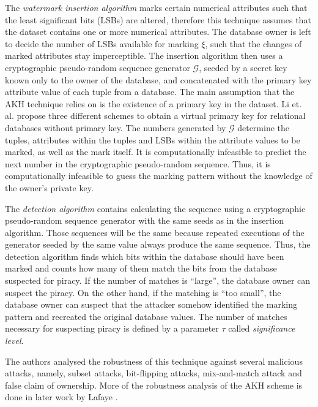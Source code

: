 \begin{enumerate}[leftmargin=*]
The \textit{watermark insertion algorithm} marks certain numerical attributes such that the least significant bits (LSBs) are altered, therefore this technique assumes that the dataset contains one or more numerical attributes.
The database owner is left to decide the number of LSBs available for marking $\xi$, such that the changes of marked attributes stay imperceptible. 
The insertion algorithm then uses a cryptographic pseudo-random sequence generator $\mathcal{G}$, seeded by a secret key known only to the owner of the database, and concatenated with the primary key attribute value of each tuple from a database. 
The main assumption that the AKH technique relies on is the existence of a primary key in the dataset. 
Li et. al. \cite{li2003constructing} propose three different schemes to obtain a virtual primary key for relational databases without primary key.
The numbers generated by $\mathcal{G}$ determine the tuples, attributes within the tuples and LSBs within the attribute values to be marked, as well as the mark itself. 
It is computationally infeasible to predict the next number in the cryptographic pseudo-random sequence.
Thus, it is computationally infeasible to guess the marking pattern without the knowledge of the owner’s private key. 

The \textit{detection algorithm} contains calculating the sequence using a cryptographic pseudo-random sequence generator with the same seeds as in the insertion algorithm. 
Those sequences will be the same because repeated executions of the generator seeded by the same value always produce the same sequence. 
Thus, the detection algorithm finds which bits within the database should have been marked and counts how many of them match the bits from the database suspected for piracy. 
If the number of matches is “large”, the database owner can suspect the piracy. 
On the other hand, if the matching is “too small”, the database owner can suspect that the attacker somehow identified the marking pattern and recreated the original database values.
The number of matches necessary for suspecting piracy is defined by a parameter $\tau$ called \textit{significance level}. 

The authors analysed the robustness of this technique against several malicious attacks, namely, subset attacks, bit-flipping attacks, mix-and-match attack and false claim of ownership. 
More of the robustness analysis of the AKH scheme is done in later work by Lafaye \cite{lafaye2007analysis}.

\end{enumerate}
